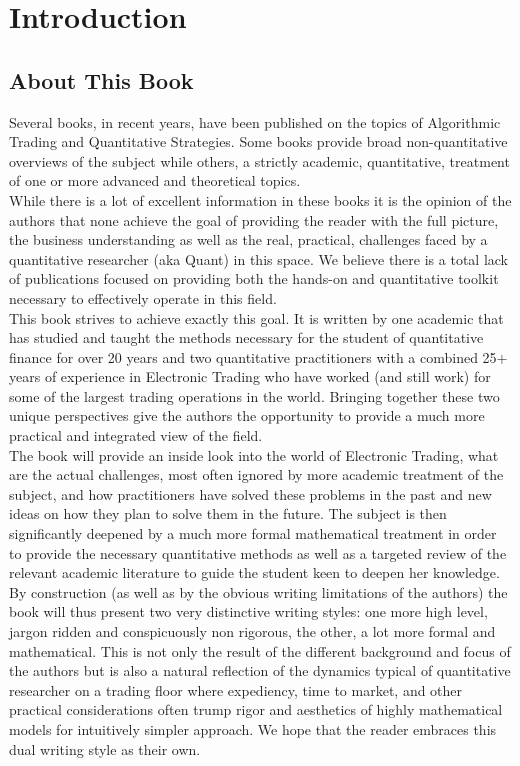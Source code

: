 \chapter{Introduction}\label{chap:ch_intro}
\section{About This Book}

Several books, in recent years, have been published  on the topics of Algorithmic Trading and Quantitative Strategies. Some books provide broad non-quantitative overviews of the subject while others, a strictly academic, quantitative, treatment of one or more advanced and theoretical topics. \\
While there is a lot of excellent information in these books it is the opinion of the authors that none achieve the goal of providing the reader with the full picture, the business understanding as well as the real, practical, challenges faced by a quantitative researcher (aka Quant) in this space. We believe there is a total lack of publications focused on providing both the hands-on and quantitative toolkit necessary to effectively operate in this field. \\

This book strives to achieve exactly this goal. It is written by one academic that has studied and taught the methods necessary for the student of quantitative finance for over 20 years and two quantitative practitioners with a combined 25+ years of experience in Electronic Trading who have worked (and still work) for some of the largest trading operations in the world. Bringing together these two unique perspectives give the authors the opportunity to provide a much more practical and integrated view of the field. \\

The book will provide an inside look into the world of Electronic Trading, what are the actual challenges, most often ignored by more academic treatment of the subject, and how practitioners have solved these problems in the past and new ideas on how they plan to solve them in the future. The subject is then significantly deepened by a much more formal mathematical treatment in order to provide the necessary quantitative methods as well as a targeted review of the relevant academic literature to guide the student keen to deepen her knowledge. \\

By construction (as well as by the obvious writing limitations of the authors) the book will thus present two very distinctive writing styles: one more high level, jargon ridden and conspicuously non rigorous, the other, a lot more formal and mathematical. This is not only the result of the different background and focus of the authors but is also a natural reflection of the dynamics typical of quantitative researcher on a trading floor where expediency, time to market, and other practical considerations often trump rigor and aesthetics of highly mathematical models for intuitively simpler approach. We hope that the reader embraces this dual writing style as their own.\\

